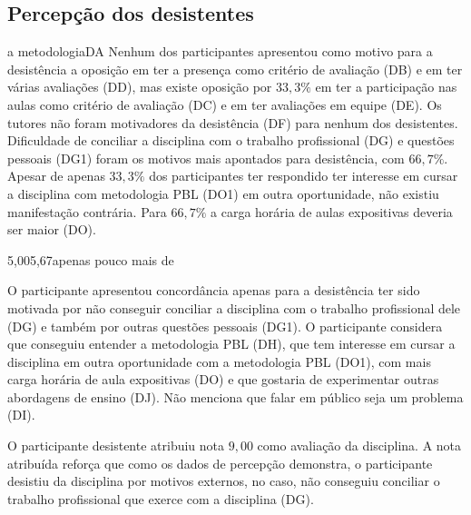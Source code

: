 \subsection{Percepção dos desistentes}
%
{a metodologia}{DA}{}{}
Nenhum dos participantes apresentou como motivo para a desistência a
oposição em ter a presença como critério de avaliação (DB) e
em ter várias avaliações (DD), mas existe oposição por $33,3\%$
em ter a participação nas aulas como critério de avaliação (DC) e em ter
avaliações em equipe (DE).
Os tutores não foram motivadores da desistência (DF) para nenhum
dos desistentes.
Dificuldade de conciliar a disciplina com
o trabalho profissional (DG) e questões pessoais (DG1)
foram os motivos mais apontados para desistência,
com $66,7\%$.
Apesar de apenas $33,3\%$ dos participantes ter respondido ter interesse
em cursar a disciplina com metodologia PBL (DO1) em outra oportunidade,
não existiu manifestação contrária.
Para $66,7\%$ a carga horária de aulas expositivas deveria ser maior (DO).

{5,00}{5,67}{apenas pouco mais de}

O participante apresentou concordância apenas para a desistência ter sido motivada
por não conseguir conciliar a disciplina com o trabalho profissional
dele (DG) e também por outras questões pessoais (DG1).
O participante considera que conseguiu entender a metodologia PBL (DH),
que tem interesse em cursar a disciplina em outra oportunidade com
a metodologia PBL (DO1), com mais carga horária de aula expositivas (DO) e
que gostaria de experimentar outras abordagens de ensino (DJ).
Não menciona que falar em público seja um problema (DI).


O participante desistente atribuiu nota $9,00$ como avaliação da
disciplina.
A nota atribuída reforça que como os dados de percepção demonstra,
o participante desistiu da disciplina por motivos externos, no caso,
não conseguiu conciliar o trabalho profissional que exerce com
a disciplina (DG).
